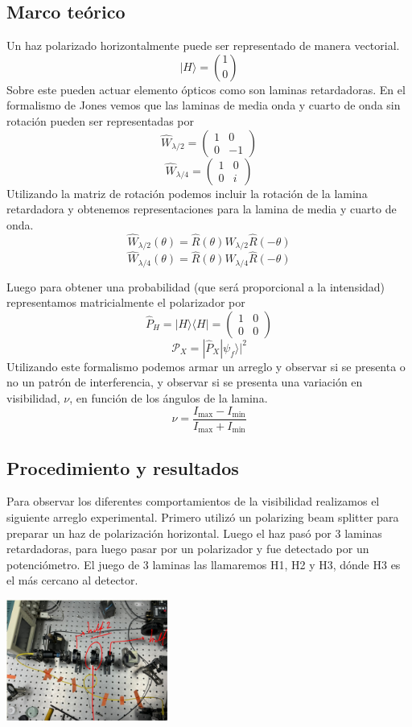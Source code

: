 \documentclass[onecolumn]{article}
\begin{document}
	\subsection{Marco teórico}
		Un haz polarizado horizontalmente puede ser representado de manera vectorial.
		$$
		|H\rangle=\binom{1}{0}
		$$
		Sobre este pueden actuar elemento ópticos como son laminas retardadoras. En el formalismo de Jones vemos que las laminas de media onda y cuarto de onda sin rotación pueden ser representadas por
		$$
		\hat{W}_{\lambda / 2}=\left(\begin{array}{cc}
		1 & 0 \\
		0 & -1
		\end{array}\right)
		$$
		$$
		\hat{W}_{\lambda / 4}=\left(\begin{array}{ll}
		1 & 0 \\
		0 & i
		\end{array}\right)
		$$
		Utilizando la matriz de rotación podemos incluir la rotación de la lamina retardadora y obtenemos representaciones para la lamina de media y cuarto de onda.
		$$
		\hat{W}_{\lambda / 2}(\theta)=\hat{R}(\theta) \hat{W}_{\lambda / 2} \hat{R}(-\theta)
		$$
		$$
		\hat{W}_{\lambda / 4}(\theta)=\hat{R}(\theta) \hat{W}_{\lambda / 4} \hat{R}(-\theta)
		$$

		Luego para obtener una probabilidad (que será proporcional a la intensidad) representamos matricialmente el polarizador por
		$$
		\hat{P}_H=|H\rangle\langle H|=
		\left(\begin{array}{ll}
		1 & 0 \\
		0 & 0
		\end{array}\right)
		$$
		$$
		\mathcal{P}_X=|\hat{P}_X | \psi_f\rangle|^ 2
		$$
		Utilizando este formalismo podemos armar un arreglo y observar si se presenta o no un patrón de interferencia, y observar si se presenta una variación en visibilidad, $\nu$, en función de los ángulos de la lamina.
		$$
		\nu=\frac{I_{\max }-I_{\min }}{I_{\max }+I_{\min }}
		$$
	\subsection{Procedimiento y resultados}
		Para observar los diferentes comportamientos de la visibilidad realizamos el siguiente arreglo experimental. Primero utilizó un polarizing beam splitter para preparar un haz de polarización horizontal. Luego el haz pasó por 3 laminas retardadoras, para luego pasar por un polarizador y fue detectado por un potenciómetro. El juego de 3 laminas las llamaremos H1, H2 y H3, dónde H3 es el más cercano al detector.
		\begin{center}
			\includegraphics[width=150pt]{img/inter/arreglo.pdf}
			\label{inter_arreglo}
		\end{center}
\end{document}
